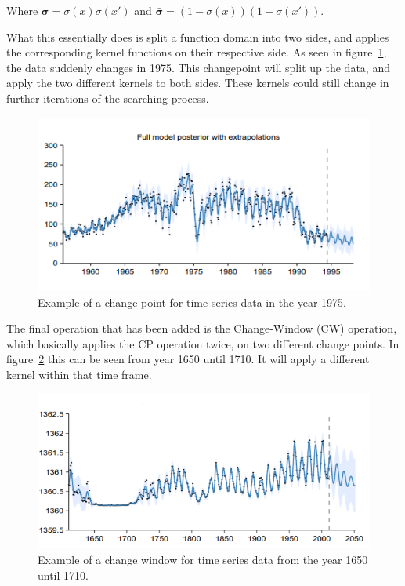 \documentclass[a4paper, 10pt, conference]{ieeeconf}
\begin{document}
Where $\boldsymbol{\sigma} = \sigma(x)\sigma(x')$ and $\boldsymbol{\bar{\sigma}} = (1 - \sigma(x))(1 - \sigma(x'))$.

What this essentially does is split a function domain into two sides, and applies the corresponding kernel functions on their respective side. As seen in figure~\ref{fig:changepointexample}, the data suddenly changes in 1975. This changepoint will split up the data, and apply the two different kernels to both sides. These kernels could still change in further iterations of the searching process.

\begin{figure}[ht!]
    \centering
    \includegraphics[width=\linewidth]{report/images/timeserieschangepoint.png}
    \caption{Example of a change point for time series data in the year 1975.~\cite{theautomaticstatistician:sulphuric}}
    \label{fig:changepointexample}
\end{figure}

The final operation that has been added is the Change-Window (CW) operation, which basically applies the CP operation twice, on two different change points. In figure~\ref{fig:changewindowexample} this can be seen from year 1650 until 1710. It will apply a different kernel within that time frame.

\begin{figure}[ht!]
    \centering
    \includegraphics[width=\linewidth]{report/images/timeserieschangewindow.png}
    \caption{Example of a change window for time series data from the year 1650 until 1710.~\cite{theautomaticstatistician:solar}}
    \label{fig:changewindowexample}
\end{figure}
\end{document}
